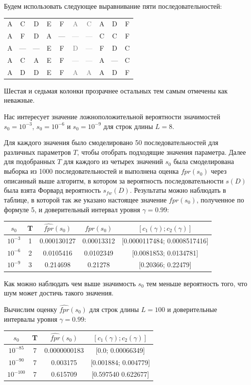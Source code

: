 \documentclass[specialist,
substylefile = spbu_report.rtx,
subf,href,colorlinks=true, 12pt]{disser}
\begin{document}
			Будем использовать следующее выравнивание пяти последовательностей:
			\begin{center}
				\begin{tabular}{cccccccccc}
					A&C&D&E&F&\textcolor{gray}{A}&\textcolor{gray}{C}&A&D&F\\
					A&F&D&A&—&\textcolor{gray}{—}&\textcolor{gray}{—}&C&C&F\\
					A&—&—&E&F&\textcolor{gray}{D}&\textcolor{gray}{—}&F&D&C\\
					A&C&A&E&F&\textcolor{gray}{—}&\textcolor{gray}{—}&A&—&C\\
					A&D&D&E&F&\textcolor{gray}{A}&\textcolor{gray}{A}&A&D&F
				\end{tabular}
			\end{center}
			Шестая и седьмая колонки прозрачнее остальных тем самым отмечены как неважные.
			
			Нас интересует значение ложноположительной вероятности значимостей $s_{0}=10^{-3}$, $s_{0}=10^{-6}$ и $s_{0}=10^{-9}$ для строк длины $L=8$.
			
			Для каждого значения было смоделировано 50 последовательностей для различных параметров $T$, чтобы отобрать подходящие значения параметра. Далее для подобранных $T$ для каждого из четырех значений $s_{0}$ была смоделирована выборка из 1000 последовательностей и выполнена оценка $\widehat{fpr}(s_{0})$ через описанный выше алгоритм, в котором за вероятность последовательности $s(D)$ была взята Форвард вероятность $s_{fw}(D)$. Результаты можно наблюдать в таблице, в которой так же указано настоящее значение $fpr(s_0)$, полученное по формуле 5, и доверительный интервал уровня $\gamma = 0.99$:
			\begin{center}
				\begin{tabular}{ccccc}
					$s_{0}$&T&$\widehat{fpr}(s_{0})$&$fpr(s_{0})$&$[c_{1}(\gamma);c_{2}(\gamma)]$  \\ \hline
					$10^{-3}$&1&0.000130127&0.00013312&[0.0000117484; 0.0008517416] \\
					$10^{-6}$&2&0.0105416&0.0102349&[0.0081853; 0.0134781] \\
					$10^{-9}$&3&0.214698&0.21278&[0.20366; 0.22479] \\					
				\end{tabular}
			\end{center}			
			Как можно наблюдать чем выше значимость $s_{0}$ тем меньше вероятность того, что шум может достичь такого значения.
			
			Вычислим оценку $\widehat{fpr}(s_{0})$ для строк длины $L=100$ и доверительные интервалы уровня $\gamma = 0.99$:
			\begin{center}
				\begin{tabular}{cccc}
					$s_{0}$&T&$\widehat{fpr}(s_{0})$&$[c_{1}(\gamma);c_{2}(\gamma)]$  \\ \hline
					$10^{-85}$&7&0.0000000183&[0.0; 0.00066349] \\
					$10^{-90}$&7&0.003175&[0.001884; 0.004779] \\ 
					$10^{-100}$&7&0.615709&[0.597540 0.622677] \\
				\end{tabular}
			\end{center}
			
			
			\nocite{Stamp2021}
			\nocite{Jurafsky2021}
			\nocite{Rabiner1989}
			\nocite{Newberg2008}
			\renewcommand{\refname}{}
			\vspace{-25pt}
			
			
						
\end{document}
